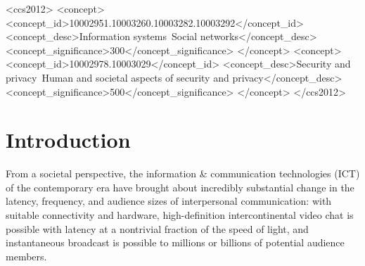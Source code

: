 \documentclass[sigconf,authordraft]{acmart}
\begin{document}

\begin{CCSXML}
<ccs2012>
   <concept>
       <concept_id>10002951.10003260.10003282.10003292</concept_id>
       <concept_desc>Information systems~Social networks</concept_desc>
       <concept_significance>300</concept_significance>
       </concept>
   <concept>
       <concept_id>10002978.10003029</concept_id>
       <concept_desc>Security and privacy~Human and societal aspects of security and privacy</concept_desc>
       <concept_significance>500</concept_significance>
       </concept>
 </ccs2012>
\end{CCSXML}






\maketitle

\section{Introduction}



From a societal perspective, the information \& communication technologies (ICT) of the contemporary era have brought about incredibly substantial change in the latency, frequency, and audience sizes of interpersonal communication: with suitable connectivity and hardware, high-definition intercontinental video chat is possible with latency at a nontrivial fraction of the speed of light, and instantaneous broadcast is possible to millions or billions of potential audience members.
\end{document}
